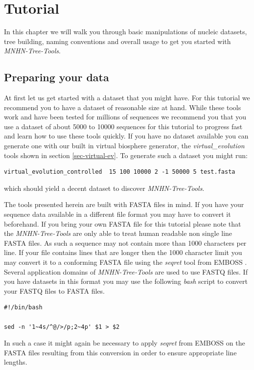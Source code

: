 \chapter{Tutorial}

In this chapter we will walk you through basic manipulations of nucleic
datasets, tree building, naming conventions and overall usage to get
you started with \emph{MNHN-Tree-Tools}.

\section{Preparing your data}

At first let us get started with a dataset that you might have. For this
tutorial we recommend you to have a dataset of reasonable size at
hand. While these tools work and have been tested for millions of
sequences we recommend you that you use a dataset of about 5000 to
10000 sequences for this tutorial to progress fast and learn how to
use these tools quickly. If you have no dataset available you can
generate one with our built in virtual biosphere generator, the
\emph{virtual\_evolution} tools shown in section
\ref{sec-virtual-ev}. To generate such a dataset you might run:
\begin{lstlisting}
virtual_evolution_controlled  15 100 10000 2 -1 50000 5 test.fasta
\end{lstlisting}
which should yield a decent dataset to discover \emph{MNHN-Tree-Tools}.

The tools presented herein are built with FASTA \cite{fasta} files in mind. If
you have your sequence data available in a different file format you
may have to convert it beforehand. If you bring your own FASTA file
for this tutorial please note that the \emph{MNHN-Tree-Tools} are only able
to treat human readable non single line FASTA files. 
As such a sequence may not contain more than 1000 characters per line.
If your file contains lines that are longer then the 1000 character
limit you may convert it to
a conforming FASTA file using the \emph{seqret} tool from EMBOSS
\cite{emboss}.
Several application domains of \emph{MNHN-Tree-Tools} are used to use FASTQ files.
If you have datasets in this format you may use the following
\emph{bash} script to convert your FASTQ files to FASTA files. 
\begin{lstlisting}
#!/bin/bash

sed -n '1~4s/^@/>/p;2~4p' $1 > $2
\end{lstlisting}
In such a case it might again be necessary to apply \emph{seqret} from
EMBOSS on the FASTA files resulting from this conversion in order to
ensure appropriate line lengths. 

